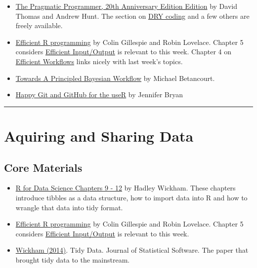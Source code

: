 \documentclass[
  12pt,
]{book}
\providecommand{\tightlist}{%
  \setlength{\itemsep}{0pt}\setlength{\parskip}{0pt}}
\begin{document}
\begin{itemize}
\tightlist
\item
  \href{https://pragprog.com/titles/tpp20/the-pragmatic-programmer-20th-anniversary-edition/}{The Pragmatic Programmer, 20th Anniversary Edition Edition} by David Thomas and Andrew Hunt. The section on \href{https://media.pragprog.com/titles/tpp20/dry.pdf}{DRY coding} and a few others are freely available.
\end{itemize}

\begin{itemize}
\item
  \href{https://csgillespie.github.io/efficientR/}{Efficient R programming} by Colin Gillespie and Robin Lovelace. Chapter 5 considers \href{https://csgillespie.github.io/efficientR/input-output.html}{Efficient Input/Output} is relevant to this week. Chapter 4 on \href{https://csgillespie.github.io/efficientR/workflow.html}{Efficient Workflows} links nicely with last week's topics.
\item
  \href{https://betanalpha.github.io/assets/case_studies/principled_bayesian_workflow.html\#References}{Towards A Principled Bayesian Workflow} by Michael Betancourt.
\end{itemize}

\begin{itemize}
\tightlist
\item
  \href{https://happygitwithr.com/}{Happy Git and GitHub for the useR} by Jennifer Bryan
\end{itemize}

\begin{center}\rule{0.5\linewidth}{0.5pt}\end{center}

\hypertarget{data-reading}{%
\section{Aquiring and Sharing Data}\label{data-reading}}

\hypertarget{core-materials-1}{%
\subsection*{Core Materials}\label{core-materials-1}}

\begin{itemize}
\item
  \href{https://r4ds.had.co.nz/tidy-data.html}{R for Data Science Chapters 9 - 12} by Hadley Wickham. These chapters introduce tibbles as a data structure, how to import data into R and how to wrangle that data into tidy format.
\item
  \href{https://csgillespie.github.io/efficientR/}{Efficient R programming} by Colin Gillespie and Robin Lovelace. Chapter 5 considers \href{https://csgillespie.github.io/efficientR/input-output.html}{Efficient Input/Output} is relevant to this week.
\item
  \href{https://vita.had.co.nz/papers/tidy-data.html}{Wickham (2014)}. Tidy Data. Journal of Statistical Software. The paper that brought tidy data to the mainstream.
\end{itemize}
\end{document}
